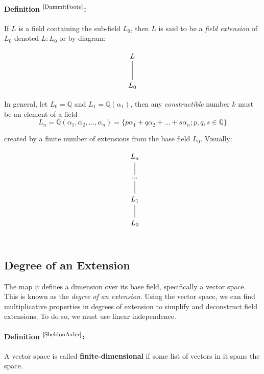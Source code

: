 \documentclass{article}
\begin{document}
\paragraph{Definition $^{\textrm{\footnotesize\cite{DummitFoote}}}$:} If $L$ is a field containing the sub-field $L_{0}$, then $L$ is said to be a \textit{field extension} of $L_0$ denoted $L:L_{0}$ or by diagram:


$$\begin{tikzcd}[row sep=large, column sep=large]
    L \arrow[dash]{d} \\
    L_0
\end{tikzcd}$$

In general, let $L_0 = \mathbb{Q}$ and $L_1 = \mathbb{Q}(\alpha_1)$, then any \textit{constructible} number $k$ must be an element of a field 
$$L_n = \mathbb{Q}(\alpha_1, \alpha_2, ... , \alpha_n) = \lbrace p\alpha_1 + q\alpha_2 + ... + s\alpha_n ; p,q,s\in\mathbb{Q} \rbrace$$

created by a finite number of extensions from the base field $L_0$. Visually:

$$\begin{tikzcd}[row sep=small, column sep=tiny]
    & L_n \arrow[dash]{dd} \\
    & \\
    & ... \arrow[dash]{dd} \\
    & \\
    & L_{1} \arrow[dash]{dd} \\
    & \\
    & L_0  \\
    & \\
\end{tikzcd}$$


\subsection{Degree of an Extension}
The map $\psi$ defines a dimension over its base field, specifically a vector space. This is known as the \textit{degree of an extension}. Using the vector space, we can find multiplicative properties in degrees of extension to simplify and deconstruct field extensions. To do so, we must use linear independence.

\paragraph{Definition $^{\textrm{\footnotesize\cite{SheldonAxler}}}$:} A vector space is called \textbf{finite-dimensional} if some list of vectors in it spans the space.
\end{document}
